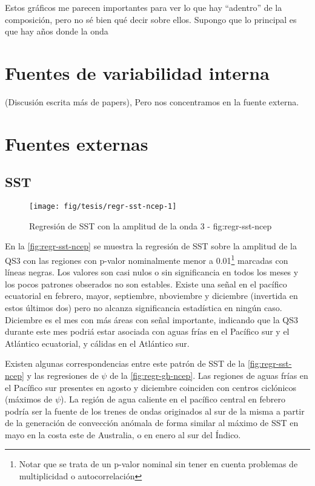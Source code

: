 \documentclass[spanish,a4paper]{book}
\let\rmarkdownfootnote\footnote%
\def\footnote{\protect\rmarkdownfootnote}
\begin{document}
Estos gráficos me parecen importantes para ver lo que hay ``adentro'' de
la composición, pero no sé bien qué decir sobre ellos. Supongo que lo
principal es que hay años donde la onda

\section{Fuentes de variabilidad
interna}\label{fuentes-de-variabilidad-interna}

(Discusión escrita más de papers), Pero nos concentramos en la fuente
externa.

\section{Fuentes externas}\label{fuentes-externas}

\subsection{SST}\label{sst}

\begin{landscape}\begin{figure}

{\centering \texttt{[image: fig/tesis/regr-sst-ncep-1]} 

}

\caption{Regresión de SST con la amplitud de la onda 3 - fig:regr-sst-ncep}\label{fig:regr-sst-ncep}
\end{figure}
\end{landscape}

En la \autoref{fig:regr-sst-ncep} se muestra la regresión de SST sobre
la amplitud de la QS3 con las regiones con p-valor nominalmente menor a
0.01\footnote{Notar que se trata de un p-valor nominal sin tener en cuenta problemas de multiplicidad o autocorrelación}
marcadas con líneas negras. Los valores son casi nulos o sin
significancia en todos los meses y los pocos patrones obserados no son
estables. Existe una señal en el pacífico ecuatorial en febrero, mayor,
septiembre, nboviembre y diciembre (invertida en estos últimos dos) pero
no alcanza significancia estadística en ningún caso. Diciembre es el mes
con más áreas con señal importante, indicando que la QS3 durante este
mes podriá estar asociada con aguas frías en el Pacífico sur y el
Atlántico ecuatorial, y cálidas en el Atlántico sur.

Existen algunas correspondencias entre este patrón de SST de la
\autoref{fig:regr-sst-ncep} y las regresiones de \(\psi\) de la
\autoref{fig:regr-gh-ncep}. Las regiones de aguas frías en el Pacífico
sur presentes en agosto y diciembre coinciden con centros ciclónicos
(máximos de \(\psi\)). La región de agua caliente en el pacífico central
en febrero podría ser la fuente de los trenes de ondas originados al sur
de la misma a partir de la generación de convección anómala de forma
similar al máximo de SST en mayo en la costa este de Australia, o en
enero al sur del Índico.
\end{document}
